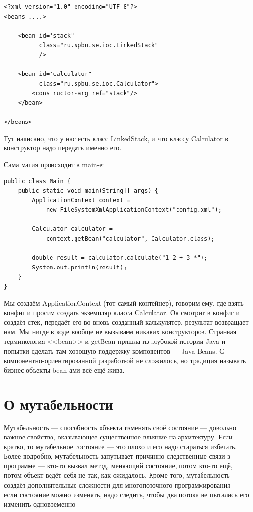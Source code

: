 \documentclass[a5paper]{article}
\begin{document}
\begin{verbatim}
<?xml version="1.0" encoding="UTF-8"?>
<beans ....>

    <bean id="stack"
          class="ru.spbu.se.ioc.LinkedStack"
          />

    <bean id="calculator"
          class="ru.spbu.se.ioc.Calculator">
        <constructor-arg ref="stack"/>
    </bean>

</beans>
\end{verbatim}

Тут написано, что у нас есть класс LinkedStack, и что классу Calculator в конструктор надо передать именно его.

Сама магия происходит в main-е:

\begin{verbatim}
public class Main {
    public static void main(String[] args) {
        ApplicationContext context = 
            new FileSystemXmlApplicationContext("config.xml");

        Calculator calculator = 
            context.getBean("calculator", Calculator.class);

        double result = calculator.calculate("1 2 + 3 *");
        System.out.println(result);
    }
}
\end{verbatim}

Мы создаём ApplicationContext (тот самый контейнер), говорим ему, где взять конфиг и просим создать экземпляр класса Calculator. Он смотрит в конфиг и создаёт стек, передаёт его во вновь созданный калькулятор, результат возвращает нам. Мы нигде в  коде вообще не вызываем никаких конструкторов. Странная терминология <<bean>> и getBean пришла из глубокой истории Java и попытки сделать там хорошую поддержку компонентов --- Java Beans. С компонентно-ориентированной разработкой не сложилось, но традиция называть бизнес-объекты bean-ами всё ещё жива.

\section{О мутабельности}

Мутабельность --- способность объекта изменять своё состояние --- довольно важное свойство, оказывающее существенное влияние на архитектуру. Если кратко, то мутабельное состояние --- это плохо и его надо стараться избегать. Более подробно, мутабельность запутывает причинно-следственные связи в программе --- кто-то вызвал метод, меняющий состояние, потом кто-то ещё, потом объект ведёт себя не так, как ожидалось. Кроме того, мутабельность создаёт дополнительные сложности для многопоточного программирования --- если состояние можно изменять, надо следить, чтобы два потока не пытались его изменить одновременно.
\end{document}

